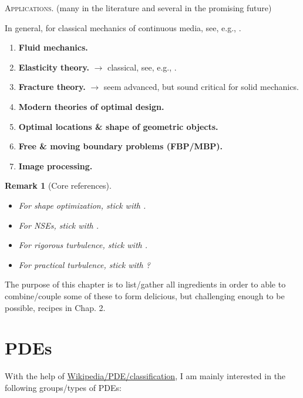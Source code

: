 \documentclass{book}
\numberwithin{equation}{section}
\newtheorem{remark}{Remark}[section]
\begin{document}
\begin{tcolorbox}
    \textsc{Applications.} (many in the literature and several in the promising future)
    
    In general, for classical mechanics of continuous media, see, e.g., \cite{Delfour_Zolesio2011,Sturm2015}.
    \begin{enumerate}
        \item \textbf{Fluid mechanics.}
        \item \textbf{Elasticity theory.} $\to$ classical, see, e.g., \cite{Sokolowski_Zolesio1992,Sturm2015,Delfour_Zolesio2011}.
        \item \textbf{Fracture theory.} $\to$ seem advanced, but sound critical for solid mechanics.
        \item \textbf{Modern theories of optimal design.}
        \item \textbf{Optimal locations \& shape of geometric objects.}
        \item \textbf{Free \& moving boundary problems (FBP/MBP).}
        \item \textbf{Image processing.}
    \end{enumerate}
\end{tcolorbox}

\begin{remark}[Core references]
    \begin{itemize}
        Here are the list of core references which should be stuck for fields interested:
        \item For shape optimization, stick with \cite{Delfour_Zolesio2011,Sokolowski_Zolesio1992,Younes2019}.
        \item For NSEs, stick with \cite{Tsai2018}.
        \item For rigorous turbulence, stick with \cite{Rebollo_Lewandowski2014}.
        \item For practical turbulence, stick with ?
    \end{itemize}
\end{remark}
The purpose of this chapter is to list/gather all ingredients in order to able to combine/couple some of these to form delicious, but challenging enough to be possible, recipes in Chap. 2.

\section{PDEs}
With the help of \href{https://en.wikipedia.org/wiki/Partial_differential_equation#Classification}{Wikipedia/PDE/classification}, I am mainly interested in the following groups/types of PDEs:
\end{document}

